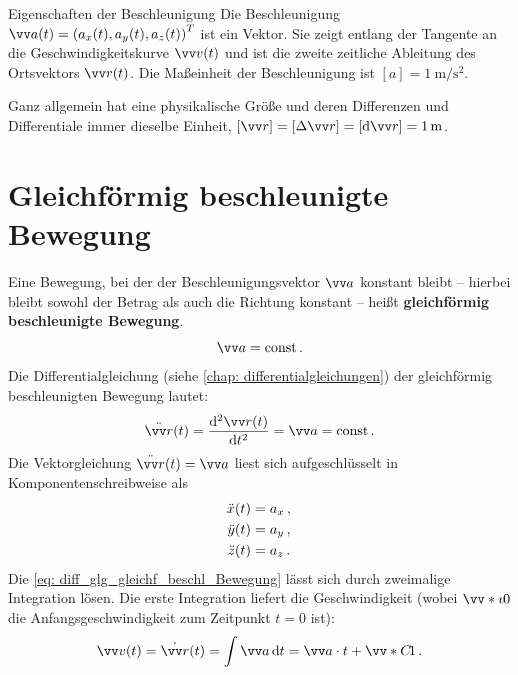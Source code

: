 \begin{rememberbox}{Eigenschaften der Beschleunigung}
    Die Beschleunigung $\ivec{a}(t)={(a_{x}(t),a_{y}(t),a_{z}(t))}^\T$ ist ein Vektor. Sie zeigt entlang der Tangente an die Geschwindigkeitskurve $\ivec{v}(t)$ und ist die zweite zeitliche Ableitung des Ortsvektors $\ivec{r}(t)$. Die Maßeinheit der Beschleunigung ist $[a] = \SI{1}{\meter\per\second\squared}$.
\end{rememberbox}
Ganz allgemein hat eine physikalische Größe und deren Differenzen und Differentiale immer dieselbe Einheit, \zB $[\ivec{r}] = [\Delta \ivec{r}] = [\dd \ivec{r}] = \SI{1}{\meter}$.

\section{Gleichförmig beschleunigte Bewegung}\label{sec: gleichf_beschl_bewegung}
Eine Bewegung, bei der der Beschleunigungsvektor $\ivec{a}$ konstant bleibt -- hierbei bleibt sowohl der Betrag als auch die Richtung konstant -- heißt \textbf{gleichförmig beschleunigte Bewegung}.
\begin{equation}\label{eq: def_glg_gleichf_beschl_Bewegung}
    \ivec{a} = \const \mDot
\end{equation}
Die Differentialgleichung (siehe \cref{chap: differentialgleichungen}) der gleichförmig beschleunigten Bewegung lautet:
\begin{equation}\label{eq: diff_glg_gleichf_beschl_Bewegung}
    \ddot{\ivec{r}}(t) = \frac{\dd^2 \ivec{r}(t)}{\dd t^2}=\ivec{a}=\const \mDot
\end{equation}
Die Vektorgleichung $\ddot{\ivec{r}}(t) = \ivec{a}$ liest sich aufgeschlüsselt in Komponentenschreibweise als 
\begin{equation}\begin{aligned}
    \ddot{x}(t) &= a_x\,{,}\, \\
    \ddot{y}(t) &= a_y\,{,}\, \\
    \ddot{z}(t) &= a_z\,.
\end{aligned}\end{equation}
Die \cref{eq: diff_glg_gleichf_beschl_Bewegung} lässt sich durch zweimalige Integration lösen. Die erste Integration liefert die Geschwindigkeit (wobei $\ivecS{v}{0}$ die Anfangsgeschwindigkeit zum Zeitpunkt $t=0$ ist):
\begin{equation}\label{eq: integral_momentantgeschwindigkeit}
    \ivec{v}(t) = \dot{\ivec{r}}(t) = \int \ivec{a} \,\dd t = \ivec{a} \cdot t + \ivecS{C}{1} \mDot
\end{equation}
